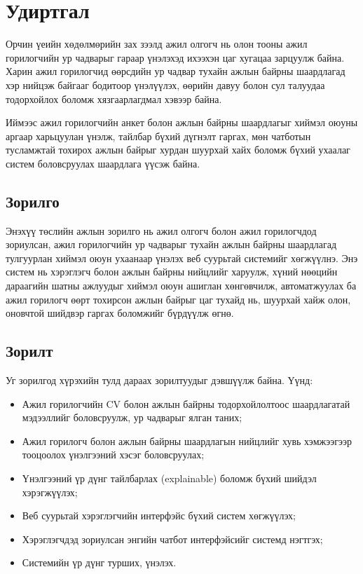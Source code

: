 
{}
\label{Introduction} %
\section*{Удиртгал} 
\par{}Орчин үеийн хөдөлмөрийн зах зээлд ажил олгогч нь олон тооны ажил горилогчийн ур чадварыг гараар үнэлэхэд ихээхэн цаг хугацаа зарцуулж байна. Харин ажил горилогчид өөрсдийн ур чадвар тухайн ажлын байрны шаардлагад хэр нийцэж байгааг бодитоор үнэлүүлэх, өөрийн давуу болон сул талуудаа тодорхойлох боломж хязгаарлагдмал хэвээр байна.
\par{}Иймээс ажил горилогчийн анкет болон ажлын байрны шаардлагыг хиймэл оюуны аргаар харьцуулан үнэлж, тайлбар бүхий дүгнэлт гаргах, мөн чатботын тусламжтай тохирох ажлын байрыг хурдан шуурхай хайх боломж бүхий ухаалаг систем боловсруулах шаардлага үүсэж байна.
\subsection*{Зорилго}
Энэхүү төслийн ажлын зорилго нь ажил олгогч болон ажил горилогчдод зориулсан, ажил горилогчийн ур чадварыг тухайн ажлын байрны шаардлагад тулгуурлан хиймэл оюун ухаанаар үнэлэх веб суурьтай системийг хөгжүүлнэ. Энэ систем нь хэрэглэгч болон ажлын байрны нийцлийг харуулж, хүний нөөцийн дараагийн шатны ажлуудыг хиймэл оюун ашиглан хөнгөвчилж, автоматжуулах ба ажил горилогч өөрт тохирсон ажлын байрыг цаг тухайд нь, шуурхай хайж олон, оновчтой шийдвэр гаргах боломжийг бүрдүүлж өгнө.

\subsection*{Зорилт}
    Уг зорилгод хүрэхийн тулд дараах зорилтуудыг дэвшүүлж байна. Үүнд:
    \begin{itemize}
        \item Ажил горилогчийн CV болон ажлын байрны тодорхойлолтоос шаардлагатай мэдээллийг боловсруулж, ур чадварыг ялган таних;
        \item Ажил горилогч болон ажлын байрны шаардлагын нийцлийг хувь хэмжээгээр тооцоолох үнэлгээний хэсэг боловсруулах;
        \item Үнэлгээний үр дүнг тайлбарлах (explainable) боломж бүхий шийдэл хэрэгжүүлэх;
        \item Веб суурьтай хэрэглэгчийн интерфэйс бүхий систем хөгжүүлэх;
        \item Хэрэглэгчдэд зориулсан энгийн чатбот интерфэйсийг системд нэгтгэх;
        \item Системийн үр дүнг турших, үнэлэх.
    \end{itemize}

